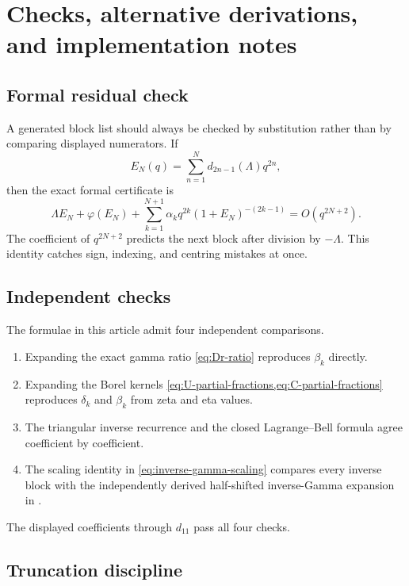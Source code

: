\documentclass[11pt,a4paper,oneside]{article}
\theoremstyle{plain}
\theoremstyle{definition}
\theoremstyle{remark}
\begin{document}
\section{Checks, alternative derivations, and implementation notes}
\label{sec:checks}

\subsection{Formal residual check}

A generated block list should always be checked by substitution rather than by
comparing displayed numerators.  If
\begin{equation}
 E_N(q)=\sum_{n=1}^{N}d_{2n-1}(\Lambda)q^{2n},
 \label{eq:EN-check}
\end{equation}
then the exact formal certificate is
\begin{equation}
 \Lambda E_N+\varphi(E_N)
 +\sum_{k=1}^{N+1}\alpha_kq^{2k}(1+E_N)^{-(2k-1)}
 =O(q^{2N+2}).
 \label{eq:formal-residual-certificate}
\end{equation}
The coefficient of $q^{2N+2}$ predicts the next block after division by
$-\Lambda$.  This identity catches sign, indexing, and centring mistakes at
once.

\subsection{Independent checks}

The formulae in this article admit four independent comparisons.
\begin{enumerate}
\item Expanding the exact gamma ratio \cref{eq:Dr-ratio} reproduces
      $\beta_k$ directly.
\item Expanding the Borel kernels \cref{eq:U-partial-fractions,eq:C-partial-fractions}
      reproduces $\delta_k$ and $\beta_k$ from zeta and eta values.
\item The triangular inverse recurrence and the closed
      Lagrange--Bell formula agree coefficient by coefficient.
\item The scaling identity in \cref{eq:inverse-gamma-scaling} compares every
      inverse block with the independently derived half-shifted inverse-Gamma
      expansion in \cite{ProveItGammaInverse}.
\end{enumerate}
The displayed coefficients through $d_{11}$ pass all four checks.

\subsection{Truncation discipline}
\end{document}
